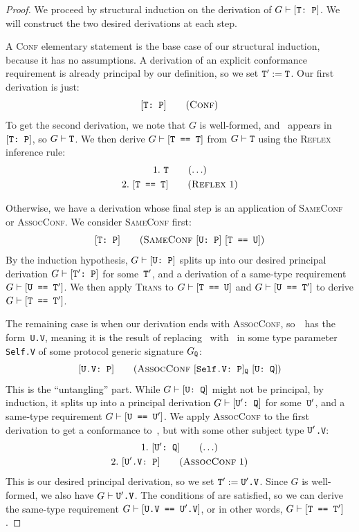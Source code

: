 \documentclass[../generics]{subfiles}
\begin{document}
\begin{proof}
We proceed by structural induction on the derivation of $G\vdash[\texttt{T:~P}]$. We will construct the two desired derivations at each step.

\BaseCase A \textsc{Conf} elementary statement is the base case of our structural induction, because it has no assumptions. A derivation of an explicit conformance requirement is already principal by our definition, so we set $\texttt{T}' := \texttt{T}$. Our first derivation is just:
\[
\ConfStepDef
\]
To get the second derivation, we note that $G$ is well-formed, and \tT\ appears in $[\texttt{T:~P}]$, so $G\vdash\texttt{T}$. We then derive $G\vdash[\texttt{T == T}]$ from $G\vdash\texttt{T}$ using the \textsc{Reflex} inference rule:
\begin{gather*}
\AnyStep{\tT}{1}\\
\ReflexStep{1}{T}{2}
\end{gather*}

\InductiveStep Otherwise, we have a derivation whose final step is an application of \textsc{SameConf} or \textsc{AssocConf}. We consider \textsc{SameConf} first:
\[
\SameConfStepDef
\]
By the induction hypothesis, $G\vdash[\texttt{U:~P}]$ splits up into our desired principal derivation $G\vdash[\texttt{$\texttt{T}'$:~P}]$ for some~$\texttt{T}'$, and a derivation of a same-type requirement $G\vdash[\texttt{U == $\texttt{T}'$}]$. We then apply \textsc{Trans} to $G\vdash[\texttt{T == U}]$ and $G\vdash[\texttt{U == $\texttt{T}'$}]$ to derive $G\vdash[\texttt{T == $\texttt{T}'$}]$.

The remaining case is when our derivation ends with \textsc{AssocConf}, so~\tT\ has the form~\texttt{U.V}, meaning it is the result of replacing \tSelf\ with \tU\ in some type parameter \texttt{Self.V} of some protocol generic signature $G_{\texttt{Q}}$:
\[
\AssocConfStepDefX
\]
This is the ``untangling'' part. While $G\vdash[\texttt{U:~Q}]$ might not be principal, by induction,
it splits up into a principal derivation $G\vdash[\texttt{$\texttt{U}'$:~Q}]$ for some~$\texttt{U}'$, and a same-type requirement $G\vdash[\texttt{U == $\texttt{U}'$}]$. We apply \textsc{AssocConf} to the first derivation to get a conformance to~\tP, but with some other subject type \texttt{$\texttt{U}'$.V}:
\begin{gather*}
\AnyStep{\ConfReq{$\tUp$}{Q}}{1}\\
\AssocConfStep{1}{$\tUp$.V}{P}{2}
\end{gather*}
This is our desired principal derivation, so we set $\texttt{T}' := \texttt{U}'\texttt{.V}$. Since $G$ is well-formed, we also have $G\vdash\texttt{U}'\texttt{.V}$. The conditions of  are satisfied, so we can derive the same-type requirement $G\vdash[\texttt{U.V == $\texttt{U}'$.V}]$, or in other words, $G\vdash[\texttt{T == $\texttt{T}'$}]$.
\end{proof}
\end{document}
